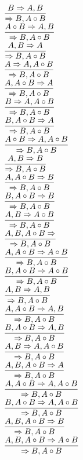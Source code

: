 \documentclass[11pt]{article}
\begin{document}
\begin{center}
\bigskip
\\$\infer{\Rightarrow B, A\circ B}{B\Rightarrow A, B}$
\bigskip
\\$\infer{\Rightarrow B, A\circ B}{A\circ B\Rightarrow A, B}$
\bigskip
\\$\infer{\Rightarrow B, A\circ B}{A, B\Rightarrow A}$
\bigskip
\\$\infer{\Rightarrow B, A\circ B}{A\Rightarrow A, A\circ B}$
\bigskip
\\$\infer{\Rightarrow B, A\circ B}{A, A\circ B\Rightarrow A}$
\bigskip
\\$\infer{\Rightarrow B, A\circ B}{B\Rightarrow A, A\circ B}$
\bigskip
\\$\infer{\Rightarrow B, A\circ B}{B, A\circ B\Rightarrow A}$
\bigskip
\\$\infer{\Rightarrow B, A\circ B}{A\circ B\Rightarrow A, A\circ B}$
\bigskip
\\$\infer{\Rightarrow B, A\circ B}{A, B\Rightarrow B}$
\bigskip
\\$\infer{\Rightarrow B, A\circ B}{A, A\circ B\Rightarrow B}$
\bigskip
\\$\infer{\Rightarrow B, A\circ B}{B, A\circ B\Rightarrow B}$
\bigskip
\\$\infer{\Rightarrow B, A\circ B}{A, B\Rightarrow A\circ B}$
\bigskip
\\$\infer{\Rightarrow B, A\circ B}{A, B, A\circ B\Rightarrow }$
\bigskip
\\$\infer{\Rightarrow B, A\circ B}{A, A\circ B\Rightarrow A\circ B}$
\bigskip
\\$\infer{\Rightarrow B, A\circ B}{B, A\circ B\Rightarrow A\circ B}$
\bigskip
\\$\infer{\Rightarrow B, A\circ B}{A, B\Rightarrow A, B}$
\bigskip
\\$\infer{\Rightarrow B, A\circ B}{A, A\circ B\Rightarrow A, B}$
\bigskip
\\$\infer{\Rightarrow B, A\circ B}{B, A\circ B\Rightarrow A, B}$
\bigskip
\\$\infer{\Rightarrow B, A\circ B}{A, B\Rightarrow A, A\circ B}$
\bigskip
\\$\infer{\Rightarrow B, A\circ B}{A, B, A\circ B\Rightarrow A}$
\bigskip
\\$\infer{\Rightarrow B, A\circ B}{A, A\circ B\Rightarrow A, A\circ B}$
\bigskip
\\$\infer{\Rightarrow B, A\circ B}{B, A\circ B\Rightarrow A, A\circ B}$
\bigskip
\\$\infer{\Rightarrow B, A\circ B}{A, B, A\circ B\Rightarrow B}$
\bigskip
\\$\infer{\Rightarrow B, A\circ B}{A, B, A\circ B\Rightarrow A\circ B}$

\end{center}
\end{document}
